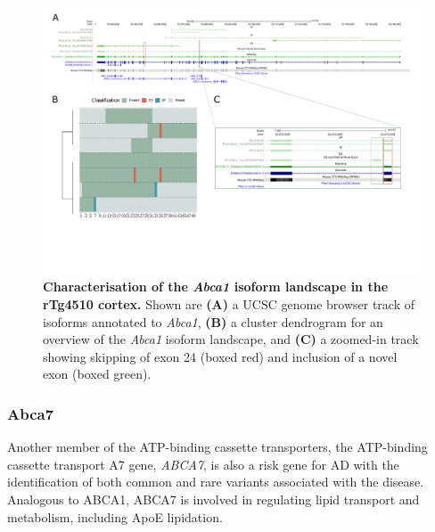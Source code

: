\begin{landscape}
	\begin{figure}[htp]
		\centering
		\includegraphics[page=1,trim={0 4cm 0 0},scale = 0.85]{Figures/TargetGenes_Annotation_Landscape.pdf}
		\captionsetup{width=1.3\textwidth}
		\caption[Characterisation of the \textit{Abca1} isoform landscape in the rTg4510 mouse cortex]%
		{\textbf{Characterisation of the \textit{Abca1} isoform landscape in the rTg4510 cortex.} Shown are \textbf{(A)} a UCSC genome browser track of isoforms annotated to \textit{Abca1}, \textbf{(B)} a cluster dendrogram for an overview of the \textit{Abca1} isoform landscape, and \textbf{(C)} a zoomed-in track showing skipping of exon 24 (boxed red) and inclusion of a novel exon (boxed green).}   
		\label{fig:abca1}
	\end{figure}
\end{landscape}
\restoregeometry

\newpage
\subsubsection{Abca7}
Another member of the ATP-binding cassette transporters, the ATP-binding cassette transport A7 gene, \textit{ABCA7}, is also a risk gene for AD with the identification of both common and rare variants associated with the disease\cite{Steinberg2015,Cuyvers2015,Guennec2016}. Analogous to ABCA1, ABCA7 is involved in regulating lipid transport and metabolism, including ApoE lipidation\cite{DeRoeck2019a}. 

